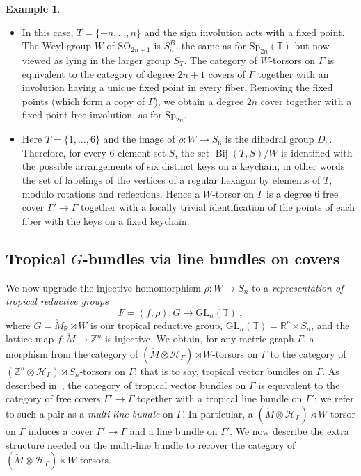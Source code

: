 \documentclass[10pt, a4paper]{amsart}
\theoremstyle{definition}
\newtheorem{example}[theorem]{Example}
\theoremstyle{myitemstyle}
\newcommand{\ZZ}{\mathbb{Z}}
\newcommand{\RR}{\mathbb{R}}
\newcommand{\TT}{\mathbb{T}}
\newcommand{\Mcheck}{{\check{M}}}
\newcommand{\mc}[1]{{\mathcal{#1}}}
\newcommand{\GL}{{\mathrm{GL}}}
\newcommand{\Sp}{{\mathrm{Sp}}}
\newcommand{\SO}{{\mathrm{SO}}}
\newcommand{\Ga}{\Gamma}
\DeclareMathOperator{\Bij}{Bij}
\begin{document}
\begin{example}
\begin{itemize}
        \item [$\SO_{2n+1}$:] In this case, $T=\{-n,\ldots,n\}$ and the sign involution acts with a fixed point. The Weyl group $W$ of $\SO_{2n+1}$ is $S_n^B$, the same as for $\Sp_{2n}(\TT)$ but now viewed as lying in the larger group $S_T$. The category of $W$-torsors on $\Ga$ is equivalent to the category of degree $2n+1$ covers of $\Ga$ together with an involution having a unique fixed point in every fiber. Removing the fixed points (which form a copy of $\Ga$), we obtain a degree $2n$ cover together with a fixed-point-free involution, as for $\Sp_{2n}$.
        
        \item[$\mathrm{G}_2$:] Here $T=\{1,\ldots,6\}$ and the image of $\rho\colon W\to S_6$ is the dihedral group $D_6$. Therefore, for every $6$-element set $S$, the set $\Bij(T,S)/W$ is identified with the possible arrangements of six distinct keys on a keychain, in other words the set of labelings of the vertices of a regular hexagon by elements of $T$, modulo rotations and reflections. Hence a $W$-torsor on $\Gamma$ is a degree $6$ free cover $\Gamma'\to \Gamma$ together with a locally trivial identification of the points of each fiber with the keys on a fixed keychain.  
    \end{itemize}
\end{example}




\subsection{Tropical $G$-bundles via line bundles on covers} \label{subsec:pushforward} We now upgrade the injective homomorphism $\rho:W\to S_n$ to a \emph{representation of tropical reductive groups}
\[
F=(f,\rho):G\longrightarrow\GL_n(\TT) \ ,
\]
where $G=\Mcheck_{\RR}\rtimes W$ is our tropical reductive group, $\GL_n(\TT)=\RR^n\rtimes S_n$, and the lattice map $f:\Mcheck \to \ZZ^n$ is injective. We obtain, for any metric graph $\Gamma$, a morphism from the category of $(\Mcheck\otimes \mc H_\Gamma)\rtimes W$-torsors on $\Gamma$ to the category of $(\ZZ^n\otimes\mc H_\Gamma)\rtimes S_n$-torsors on $\Gamma$; that is to say, tropical vector bundles on $\Gamma$. As described in~\cite{2022GrossUlirschZakharov}, the category of tropical vector bundles on $\Gamma$ is equivalent to the category of free covers $\Ga'\to \Ga$ together with a tropical line bundle on $\Ga'$; we refer to such a pair as a \emph{multi-line bundle} on $\Ga$. In particular, a $(\Mcheck\otimes \mc H_\Gamma)\rtimes W$-torsor on $\Ga$ induces a cover $\Ga'\to \Ga$ and a line bundle on $\Ga'$. We now describe the extra structure needed on the multi-line bundle to recover the category of $(\Mcheck\otimes \mc H_\Gamma)\rtimes W$-torsors.
\end{document}
